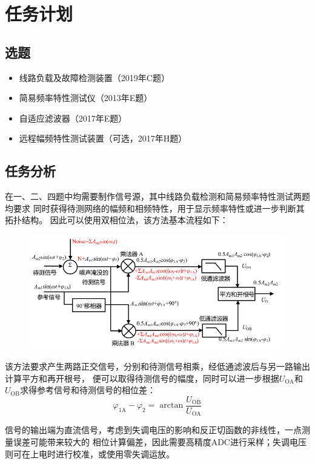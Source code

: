 \section{任务计划}
\subsection{选题}
\begin{itemize}
    \item 线路负载及故障检测装置（2019年C题）
    \item 简易频率特性测试仪（2013年E题）
    \item 自适应滤波器（2017年E题）
    \item 远程幅频特性测试装置（可选，2017年H题）
\end{itemize}

\subsection{任务分析}
在一、二、四题中均需要制作信号源，其中线路负载检测和简易频率特性测试两题均要求
同时获得待测网络的幅频和相频特性，用于显示频率特性或进一步判断其拓扑结构。
因此可以使用双相位法，该方法基本流程如下：

\begin{figure}[H]
\center
    \includegraphics[width=\textwidth]{img/biphasic.png}
\end{figure}

该方法要求产生两路正交信号，分别和待测信号相乘，经低通滤波后与另一路输出计算平方和再开根号，
便可以取得待测信号的幅度，同时可以进一步根据$U_\textrm{OA}$和$U_\textrm{OB}$求得参考信号和待测信号的相位差：
\begin{equation}
    \varphi_\textrm{1A}-\varphi_\textrm{2} =
    \arctan{\dfrac{U_\textrm{OB}}{U_\textrm{OA}}}
\end{equation}

信号的输出端为直流信号，考虑到失调电压的影响和反正切函数的非线性，一点测量误差可能带来较大的
相位计算偏差，因此需要高精度ADC进行采样；失调电压则可在上电时进行校准，或使用零失调运放。

